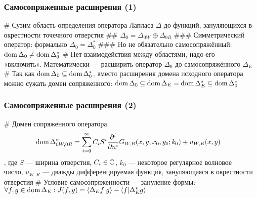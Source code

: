 \documentclass{beamer}
\begin{document}
\begin{frame}[fragile]
\frametitle{Самосопряженные расширения (1)}
\begin{easylist}[itemize]
# Сузим область определения оператора Лапласа $\Delta$ до функций, зануляющихся в окрестности точечного отверстия
## $\Delta_0 = \Delta_{0W} \oplus \Delta_{0R}$
### Симметрический оператор: формально $\Delta_0 = \Delta_0^*$
### Но не обязательно самосопряжённый: $\operatorname{dom}{\Delta_0} \ne \operatorname{dom}{\Delta_0^*}$
# Нет взаимодействия между областями, надо его «включить». Математически — расширить оператор $\Delta_0$ до самосопряжённого $\Delta_E$
# Так как $\operatorname{dom}{\Delta_0} \subseteq \operatorname{dom}{\Delta_0^*}$, вместо расширения домена исходного оператора можно сужать домен сопряженного: $\operatorname{dom}{\Delta_0} \subseteq \operatorname{dom}{\Delta_E} = \operatorname{dom}{\Delta_E^*} \subseteq \operatorname{dom}{\Delta_0^*}$
\end{easylist}
\end{frame}

\begin{frame}[fragile]
\frametitle{Самосопряженные расширения (2)}
\begin{easylist}[itemize]
# Домен сопряженного оператора:
\[
\operatorname{dom} \Delta_{0W, 0R}^* = \sum\limits_{i = 0}^\infty C_i S^i \pdv[i]{}{n} G_{W, R}(x, y, x_0, y_0; k_0) + u_{W, R} (x, y)
\],
где $S$ — ширина отверстия, $C_i \in \mathbb{C}$, $k_0$ — некоторое регулярное волновое число, $u_{W, R}$ — дважды дифференцируемая функция, зануляющаяся в окрестности отверстия
# Условие самосопряженности — зануление формы: $\forall f, g \in \dom{\Delta_E}: J(f, g) = \ip{\Delta_E f}{g} - \ip{f}{\Delta_E^* g}$
\end{easylist}
\end{frame}

\end{document}
